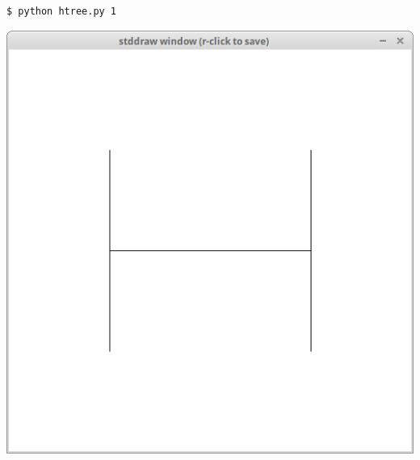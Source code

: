 \documentclass[8pt,a4paper,compress]{beamer}
\begin{document}
\begin{frame}[fragile]
\begin{minipage}{160pt}
\begin{lstlisting}[language={}]
$ python htree.py 1
\end{lstlisting}
\end{minipage}%
\begin{minipage}{140pt}
\hfill \includegraphics[scale=0.15]{figures/htree1.png}
\end{minipage}

\smallskip


\end{frame}
\end{document}
